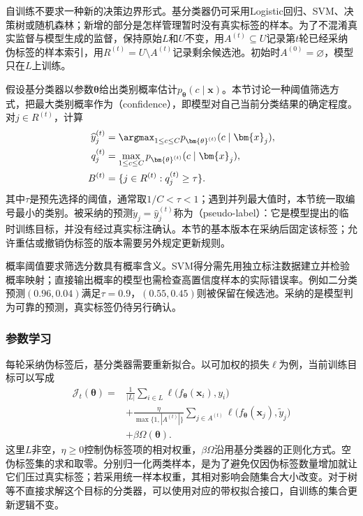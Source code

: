 自训练不要求一种新的决策边界形式。基分类器仍可采用Logistic回归、SVM、决策树或随机森林；新增的部分是怎样管理暂时没有真实标签的样本。为了不混淆真实监督与模型生成的监督，保持原始$L$和$U$不变，用$A^{(t)}\subseteq U$记录第$t$轮已经采纳伪标签的样本索引，用$R^{(t)}=U\setminus A^{(t)}$记录剩余候选池。初始时$A^{(0)}=\varnothing$，模型只在$L$上训练。

假设基分类器以参数$\bm{\theta}$给出类别概率估计$p_{\bm{\theta}}(c\mid\bm{x})$。本节讨论一种阈值筛选方式，把最大类别概率作为（confidence），即模型对自己当前分类结果的确定程度。对$j\in R^{(t)}$，计算
\begin{equation}
  \label{eq:classification-self-training-selection}
  \begin{aligned}
    \widehat y_j^{(t)}
      &=\argmax_{1\leq c\leq C}
        p_{\bm{\theta}^{(t)}}(c\mid\bm{x}_j),\\
    q_j^{(t)}
      &=\max_{1\leq c\leq C}
        p_{\bm{\theta}^{(t)}}(c\mid\bm{x}_j),\\
    B^{(t)}
      &=\{j\in R^{(t)}:q_j^{(t)}\geq\tau\}.
  \end{aligned}
\end{equation}
其中$\tau$是预先选择的阈值，通常取$1/C<\tau<1$；遇到并列最大值时，本节统一取编号最小的类别。被采纳的预测$\widetilde y_j=\widehat y_j^{(t)}$称为（pseudo-label）：它是模型提出的临时训练目标，并没有经过真实标注确认。本节的基本版本在采纳后固定该标签；允许重估或撤销伪标签的版本需要另外规定更新规则。

概率阈值要求筛选分数具有概率含义。SVM得分需先用独立标注数据建立并检验概率映射；直接输出概率的模型也需检查高置信度样本的实际错误率。例如二分类预测$(0.96,0.04)$满足$\tau=0.9$，$(0.55,0.45)$则被保留在候选池。采纳的是模型判为可靠的预测，真实标签仍待另行确认。

\subsubsection{参数学习}
\label{sec:classification-self-training-learning}

每轮采纳伪标签后，基分类器需要重新拟合。以可加权的损失$\ell$为例，当前训练目标可以写成
\begin{equation}
  \label{eq:classification-self-training-objective}
  \begin{aligned}
    \mathcal{J}_t(\bm{\theta})
      ={}&\frac{1}{|L|}\sum_{i\in L}
        \ell\bigl(f_{\bm{\theta}}(\bm{x}_i),y_i\bigr)\\
      &+\frac{\eta}{\max\{1,|A^{(t)}|\}}
        \sum_{j\in A^{(t)}}
        \ell\bigl(f_{\bm{\theta}}(\bm{x}_j),\widetilde y_j\bigr)\\
      &+\beta\Omega(\bm{\theta}).
  \end{aligned}
\end{equation}
这里$L$非空，$\eta\geq0$控制伪标签项的相对权重，$\beta\Omega$沿用基分类器的正则化方式。空伪标签集的求和取零。分别归一化两类样本，是为了避免仅因伪标签数量增加就让它们压过真实标签；若采用统一样本权重，其相对影响会随集合大小改变。对于树等不直接求解这个目标的分类器，可以使用对应的带权拟合接口，自训练的集合更新逻辑不变。


